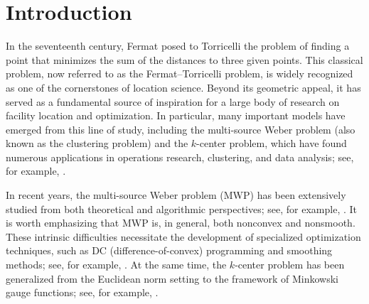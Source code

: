 \documentclass[sn-mathphys-num]{sn-jnl}%
\theoremstyle{definition}
\begin{document}



\maketitle

\section{Introduction}In the seventeenth century, Fermat posed to Torricelli the problem of finding a point that minimizes the sum of the distances to three given points. This classical problem, now referred to as the Fermat--Torricelli problem, is widely recognized as one of the cornerstones of location science. Beyond its geometric appeal, it has served as a fundamental source of inspiration for a large body of research on facility location and optimization. In particular, many important models have emerged from this line of study, including the multi-source Weber problem (also known as the clustering problem) and the $k$-center problem, which have found numerous applications in operations research, clustering, and data analysis; see, for example, \cite{Aggarwal2014,Bagirov2006,Bagirov2011,Gunther2016,Gunther2018,Jain2010,Kantardzic2011,Kuhn1973,Martini2002,mordukhovich2011applications,Nam2017,Nam2018,Ordin2015}.


In recent years, the multi-source Weber problem (MWP) has been extensively studied from both theoretical and algorithmic perspectives; see, for example, \cite{cuong2020qualitative,cuong2023global,CTWYOptim,Cuong2024}. It is worth emphasizing that MWP is, in general, both nonconvex and nonsmooth. These intrinsic difficulties necessitate the development of specialized optimization techniques, such as DC (difference-of-convex) programming and smoothing methods; see, for example, \cite{AragonArtacho2022,TA1,Tao1986}. At the same time, the $k$-center problem has been generalized from the Euclidean norm setting to the framework of Minkowski gauge functions; see, for example, \cite{LNSYkcenter,LNTV}.
\end{document}
